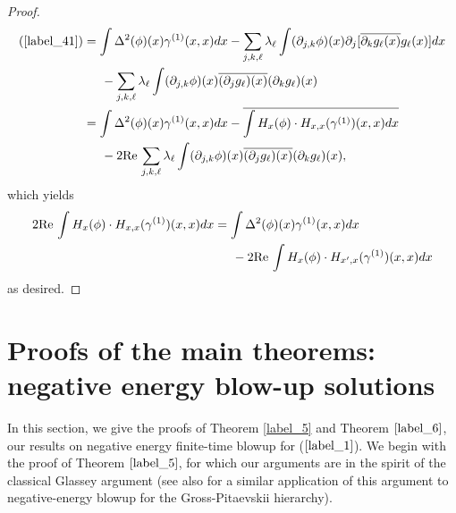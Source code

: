 \documentclass[reqno]{amsart}
\numberwithin{equation}{section}
\theoremstyle{remark}
\begin{document}
\begin{proof}
\begin{align*}
(\ref{label_41})&=\int \Delta^2(\phi)(x)\gamma^{(1)}(x,x)dx-\sum_{j,k,\ell}\lambda_\ell\int (\partial_{j,k}\phi)(x)\partial_{j}[\overline{\partial_{k}g_\ell(x)}g_{\ell}(x)]dx\\
&\hspace{0.2in}-\sum_{j,k,\ell} \lambda_\ell\int(\partial_{j,k}\phi)(x)\overline{(\partial_{j}g_\ell)(x)}(\partial_{k}g_\ell)(x)\\
&=\int \Delta^2(\phi)(x)\gamma^{(1)}(x,x)dx-\overline{\int H_{x}(\phi)\cdot H_{x,x}(\gamma^{(1)})(x,x)dx}\\
&\hspace{0.2in}-2\textrm{Re}\,\sum_{j,k,\ell} \lambda_\ell\int(\partial_{j,k}\phi)(x)\overline{(\partial_{j}g_\ell)(x)}(\partial_{k}g_\ell)(x),
\end{align*}
which yields
\begin{align*}
2\textrm{Re}\,\int H_{x}(\phi)\cdot H_{x,x}(\gamma^{(1)})(x,x)dx&=\int \Delta^2(\phi)(x)\gamma^{(1)}(x,x)dx\\
&\hspace{0.2in}-2\textrm{Re}\,\int H_{x}(\phi)\cdot H_{x',x}(\gamma^{(1)})(x,x)dx
\end{align*}
as desired.
\end{proof}


\section{Proofs of the main theorems: negative energy blow-up solutions}

In this section, we give the proofs of Theorem \ref{label_5} and Theorem $\ref{label_6}$, our results on negative energy finite-time blowup for ($\ref{label_1}$).  We begin with the proof of Theorem $\ref{label_5}$, for which our arguments are in the spirit of the classical Glassey argument (see also \cite{CPT} for a similar application of this argument to negative-energy blowup for the Gross-Pitaevskii hierarchy).
\end{document}
